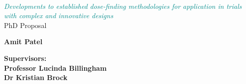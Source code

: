 \documentclass[a4paper, 11pt]{article} %
\begin{document}
 


\begin{titlepage} %

	\centering %

	
	\setlength{\unitlength}{0.6\textwidth} %
	
	{\color{AliceBlue}}\\[\baselineskip] %
	
	\textcolor{DarkCyan}{\textit{\Huge Developments to established dose-finding methodologies for application in trials with complex and innovative designs}}\\[\baselineskip] %
	
	{\color{DarkCyan}\Large PhD Proposal}\\ %
	
	{\color{AliceBlue}} %
		\vfill
	
	\bigskip %
	
	
	{\Large\textbf{Amit Patel}}\\  %
	
	\bigskip %
	
	{\Large\textbf{Supervisors:}}\\
	{\Large\textbf{Professor Lucinda Billingham}}\\ 
	{\Large\textbf{Dr Kristian Brock}}\\
	
	\vfill

\end{titlepage}

\newpage
\tableofcontents
\newpage

\end{document}

